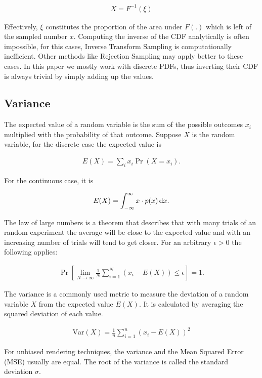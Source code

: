 \begin{align}
 X = F^{-1}(\xi)
\end{align}

Effectively, $\xi$ constitutes the proportion of the area under $F(.)$ which is left of the sampled number $x$. Computing the inverse of the CDF analytically is often impossible, for this cases, Inverse Transform Sampling is computationally inefficient. Other methods like Rejection Sampling may apply better to these cases. In this paper we mostly work with discrete PDFs, thus inverting their CDF is always trivial by simply adding up the values.

\subsection{Variance}
\label{sec:var}
The expected value of a random variable is the sum of the possible outcomes $x_i$ multiplied with the probability of that outcome. Suppose $X$ is the random variable, for the discrete case the expected value is

\begin{align}
 E(X) = \sum_i x_i \Pr(X = x_i).
\end{align}

For the continuous case, it is 

\begin{align}
 E(X) = \int_{-\infty}^{\infty} x \cdot p(x) \mathop{}\!\mathrm{d} x.
\end{align}

The law of large numbers is a theorem that describes that with many trials of an random experiment the average will be close to the expected value and with an increasing number of trials will tend to get closer. For an arbitrary $\epsilon > 0$ the following applies:

\begin{align}
 \Pr\left[ \lim_{N\rightarrow \infty} \frac{1}{N} \sum_{i=1}^N (x_i - E(X)) \leq \epsilon \right] = 1.
\end{align}

The variance is a commonly used metric to measure the deviation of a random variable $X$ from the expected value $E(X)$. It is calculated by averaging the squared deviation of each value.

\begin{align}
 \text{Var}(X) = \frac{1}{n} \sum_{i=1}^{n}(x_i - E(X))^2
\end{align}

For unbiased rendering techniques, the variance and the Mean Squared Error (MSE) usually are equal. The root of the variance is called the standard deviation $\sigma$.

